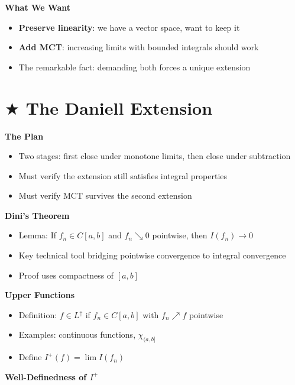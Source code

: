 \documentclass[
  10pt,
  letterpaper,
]{scrbook}
\providecommand{\tightlist}{%
  \setlength{\itemsep}{0pt}\setlength{\parskip}{0pt}}
\begin{document}
\textbf{What We Want}

\begin{itemize}
\tightlist
\item
  \textbf{Preserve linearity}: we have a vector space, want to keep it
\item
  \textbf{Add MCT}: increasing limits with bounded integrals should work
\item
  The remarkable fact: demanding both forces a unique extension
\end{itemize}

\section{\texorpdfstring{\(\bigstar\) The Daniell
Extension}{\textbackslash bigstar The Daniell Extension}}\label{bigstar-the-daniell-extension}

\textbf{The Plan}

\begin{itemize}
\tightlist
\item
  Two stages: first close under monotone limits, then close under
  subtraction
\item
  Must verify the extension still satisfies integral properties
\item
  Must verify MCT survives the second extension
\end{itemize}

\textbf{Dini's Theorem}

\begin{itemize}
\tightlist
\item
  Lemma: If \(f_n \in C[a,b]\) and \(f_n \searrow 0\) pointwise, then
  \(I(f_n) \to 0\)
\item
  Key technical tool bridging pointwise convergence to integral
  convergence
\item
  Proof uses compactness of \([a,b]\)
\end{itemize}

\textbf{Upper Functions}

\begin{itemize}
\tightlist
\item
  Definition: \(f \in L^\uparrow\) if \(f_n \in C[a,b]\) with
  \(f_n \nearrow f\) pointwise
\item
  Examples: continuous functions, \(\chi_{(a,b]}\)
\item
  Define \(I^+(f) = \lim I(f_n)\)
\end{itemize}

\textbf{Well-Definedness of \(I^+\)}
\end{document}
